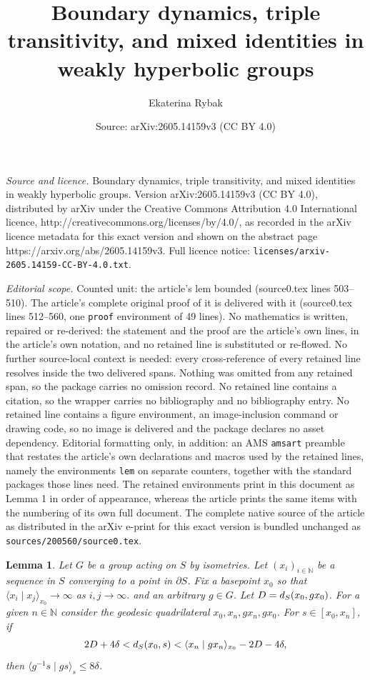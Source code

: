 \documentclass[10pt,a4paper]{amsart}
\title{Boundary dynamics, triple transitivity, and mixed identities in weakly hyperbolic groups}
\author{Ekaterina Rybak}
\date{Source: arXiv:2605.14159v3 (CC BY 4.0)}
\newtheorem{lem}{Lemma}
\newcommand{\NN}{\mathbb{N}}
\renewcommand{\d}{{\rm d}}
\begin{document}
\maketitle

\noindent\emph{Source and licence.} Boundary dynamics, triple transitivity, and mixed identities in weakly hyperbolic groups. Version arXiv:2605.14159v3 (CC BY 4.0), distributed by arXiv under the Creative Commons Attribution 4.0 International licence, http://creativecommons.org/licenses/by/4.0/, as recorded in the arXiv licence metadata for this exact version and shown on the abstract page https://arxiv.org/abs/2605.14159v3. Full licence notice: \texttt{licenses/arxiv-2605.14159-CC-BY-4.0.txt}.\par\smallskip

\noindent\textit{Editorial scope.} Counted unit: the article's lem bounded (source0.tex lines 503--510). The article's complete original proof of it is delivered with it (source0.tex lines 512--560, one \texttt{proof} environment of 49 lines). No mathematics is written, repaired or re-derived: the statement and the proof are the article's own lines, in the article's own notation, and no retained line is substituted or re-flowed.  No further source-local context is needed: every cross-reference of every retained line resolves inside the two delivered spans.  Nothing was omitted from any retained span, so the package carries no omission record.  No retained line contains a citation, so the wrapper carries no bibliography and no bibliography entry.  No retained line contains a figure environment, an image-inclusion command or drawing code, so no image is delivered and the package declares no asset dependency.  Editorial formatting only, in addition: an AMS \texttt{amsart} preamble that restates the article's own declarations and macros used by the retained lines, namely the environments \texttt{lem} on separate counters, together with the standard packages those lines need.  The retained environments print in this document as Lemma 1 in order of appearance, whereas the article prints the same items with the numbering of its own full document.  The complete native source of the article as distributed in the arXiv e-print for this exact version is bundled unchanged as \texttt{sources/200560/source0.tex}.
\begin{lem}\label{gromov product is bounded}
Let $G$ be a group acting on $S$ by isometries. Let $(x_i)_{i\in \NN}$ be a sequence in $S$ converging to a point in $\partial S$. Fix a basepoint $x_0$ so that $\langle x_i \mid x_j \rangle_{x_0} \longrightarrow \infty$ as $i, j \longrightarrow \infty.$ and an arbitrary $g \in G$. Let $D=\d_S(x_0, gx_0)$. For a given $n \in \NN$ consider the geodesic quadrilateral $x_0, x_n, gx_n, gx_0$.
For $s \in [x_0, x_n]$, if 
\begin{equation}\label{Choice of s 2}
2D+4\delta < \d_S(x_0,s) <\langle x_n \mid  gx_n \rangle_{x_0} -2D -4\delta,
\end{equation}
then $\langle g^{-1}s \mid gs \rangle_s \leq 8\delta$.
\end{lem}
\end{document}

